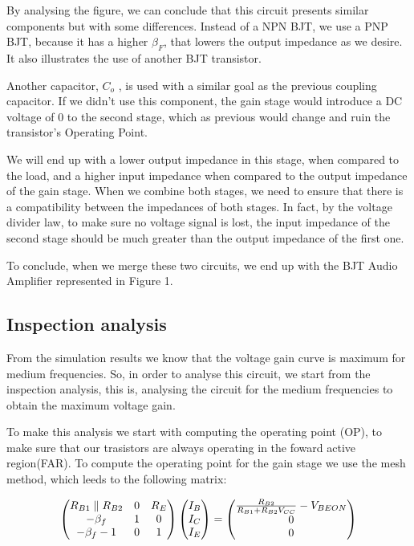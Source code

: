 By analysing the figure, we can conclude that this circuit presents similar components but with some differences.
Instead of a NPN BJT, we use a PNP BJT, because it has a higher $\beta_F$, that lowers the
output impedance as we desire. It also illustrates the use of another BJT transistor. \par
Another capacitor, $C_o$ , is used with a similar goal as the previous coupling capacitor. If we
didn’t use this component, the gain stage would introduce a DC voltage of 0 to the second stage,
which as previous would change and ruin the transistor’s Operating Point. \par
We will end up with a lower output impedance in this stage, when compared to
the load, and a higher input impedance when compared to the output impedance of the gain
stage. When we combine both stages, we need to ensure that there is a compatibility between the
impedances of both stages. In fact, by the voltage divider law, to make sure no voltage signal is lost, the input
impedance of the second stage should be much greater than the output impedance of the first
one.\par

To conclude, when we merge these two circuits, we end up with the BJT Audio Amplifier represented in Figure 1.



\subsection{Inspection analysis}

From the simulation results we know that the voltage gain curve is maximum for medium frequencies. So, in order to analyse this circuit, we start from the inspection analysis, this is, analysing the circuit for the medium frequencies to obtain the maximum voltage gain. 

To make this analysis we start with computing the operating point (OP), to make sure that our trasistors are always operating in the foward active region(FAR). To compute the operating point for the gain stage we use the mesh method, which leeds to the following matrix:

\begin{equation}
\begin{pmatrix}
R_{B1} \parallel R_{B2} & 0 & R_E \\
-\beta_f & 1 & 0 \\
-\beta_f - 1 & 0 & 1 \\ 
\end{pmatrix}
\begin{pmatrix}
I_B\\
I_C\\
I_E
\end{pmatrix}
=
\begin{pmatrix}
\frac{R_{B2}}{R_{B1} + R_{B2}V_{CC}} - V_{BEON}\\
0\\
0
\end{pmatrix}
\centering
\end{equation}

